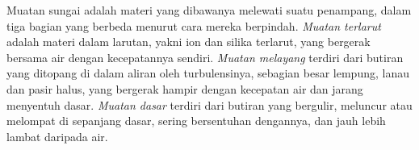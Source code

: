 \begin{definition}\label{def:b1:erosion-transport:load}
Muatan sungai adalah materi yang dibawanya melewati suatu penampang, dalam tiga bagian yang berbeda menurut cara mereka berpindah. \emph{Muatan terlarut} adalah materi dalam larutan, yakni ion dan silika terlarut, yang bergerak bersama air dengan kecepatannya sendiri. \emph{Muatan melayang} terdiri dari butiran yang ditopang di dalam aliran oleh turbulensinya, sebagian besar lempung, lanau dan pasir halus, yang bergerak hampir dengan kecepatan air dan jarang menyentuh dasar. \emph{Muatan dasar} terdiri dari butiran yang bergulir, meluncur atau melompat di sepanjang dasar, sering bersentuhan dengannya, dan jauh lebih lambat daripada air.
\end{definition}

